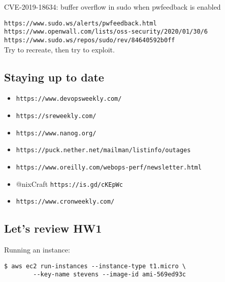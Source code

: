 \documentclass[xga]{xdvislides}
\begin{document}
CVE-2019-18634: buffer overflow in sudo when pwfeedback is enabled \\
\vspace{.125in}

{\tt https://www.sudo.ws/alerts/pwfeedback.html} \\
{\tt https://www.openwall.com/lists/oss-security/2020/01/30/6} \\
{\tt https://www.sudo.ws/repos/sudo/rev/84640592b0ff} \\

\vspace{.5in}
Try to recreate, then try to exploit.


\subsection{Staying up to date}

\begin{itemize}
        \item {\tt https://www.devopsweekly.com/}
        \item {\tt https://sreweekly.com/}
        \item {\tt https://www.nanog.org/}
        \item {\tt https://puck.nether.net/mailman/listinfo/outages}
	\item {\tt https://www.oreilly.com/webops-perf/newsletter.html}
	\item @nixCraft {\tt https://is.gd/cKEpWc} 
	\item {\tt https://www.cronweekly.com/}
\end{itemize}

\newpage
%

\subsection{Let's review HW1}
\vspace{.5in}
Running an instance:
\begin{verbatim}
$ aws ec2 run-instances --instance-type t1.micro \
        --key-name stevens --image-id ami-569ed93c
\end{verbatim}
\end{document}
